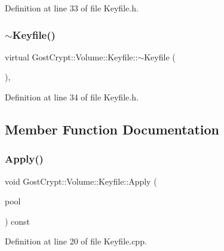 Definition at line 33 of file Keyfile.\+h.

\mbox{\label{class_gost_crypt_1_1_volume_1_1_keyfile_ae3de2997702e1d6eca91fe2eb08ef14d}} 
\subsubsection{\texorpdfstring{$\sim$\+Keyfile()}{~Keyfile()}}
{\footnotesize\ttfamily virtual Gost\+Crypt\+::\+Volume\+::\+Keyfile\+::$\sim$\+Keyfile (\begin{DoxyParamCaption}{ }\end{DoxyParamCaption})\hspace{0.3cm}{\ttfamily [inline]}, {\ttfamily [virtual]}}



Definition at line 34 of file Keyfile.\+h.



\subsection{Member Function Documentation}
\mbox{\label{class_gost_crypt_1_1_volume_1_1_keyfile_a6cb59e7b780543538a8c53f9b00d4434}} 
\subsubsection{\texorpdfstring{Apply()}{Apply()}}
{\footnotesize\ttfamily void Gost\+Crypt\+::\+Volume\+::\+Keyfile\+::\+Apply (\begin{DoxyParamCaption}\item[{\hyperlink{class_gost_crypt_1_1_buffer_ptr}{Buffer\+Ptr} \&}]{pool }\end{DoxyParamCaption}) const\hspace{0.3cm}{\ttfamily [protected]}}



Definition at line 20 of file Keyfile.\+cpp.


